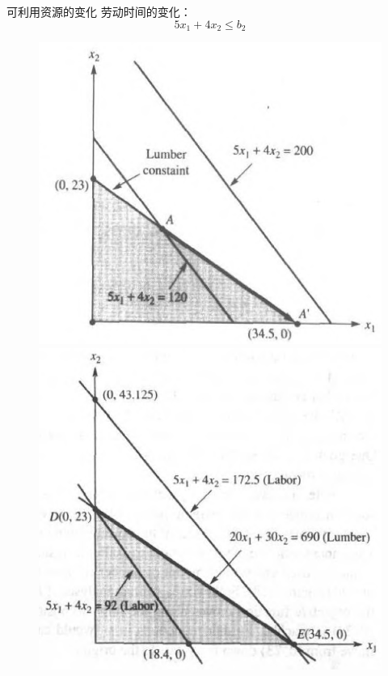 \documentclass[mathserif, table]{beamer}
\begin{document}
\begin{frame}{可利用资源的变化}
  劳动时间的变化：
  \[
  5x_1 + 4x_2 \le b_2
  \]

  \begin{figure}
    \begin{minipage}{.5\linewidth}
      \includegraphics[width=\textwidth{}]{labor2.png}
    \end{minipage}%
    \begin{minipage}{.5\linewidth}
      \includegraphics[width=\textwidth{}]{labor3.png}
    \end{minipage}
  \end{figure}  

\end{frame}
\end{document}
